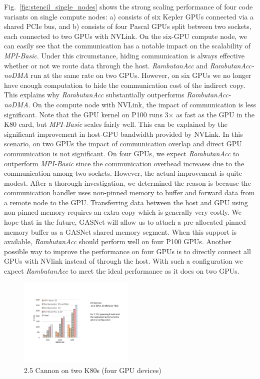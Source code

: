 Fig.~\ref{fig:stencil_single_nodes} shows the strong scaling performance of four code variants on single compute nodes: a) consists of six Kepler GPUs connected via a shared PCIe bus, and b) consists of four Pascal GPUs split between two sockets, each connected to two GPUs with NVLink.
On the six-GPU compute node, we can easily see that the communication has a notable impact on the scalability of {\em MPI-Basic}.
Under this circumstance, hiding communication is always effective whether or not we route data through the host.
{\em RambutanAcc} and {\em RambutanAcc-noDMA} run at the same rate on two GPUs.
However, on six GPUs we no longer have enough computation to hide the communication cost of the indirect copy.
This explains why {\em RambutanAcc} substantially outperforms {\em RambutanAcc-noDMA}.
On the compute node with NVLink, the impact of communication is less significant.
Note that the GPU kernel on P100 runs 3$\times$ as fast as the GPU in the K80 card, but {\em MPI-Basic} scales fairly well.
This can be explained by the significant improvement in host-GPU bandwidth provided by NVLink.
In this scenario, on two GPUs the impact of communication overlap and direct GPU communication is not significant.
On four GPUs, we expect {\em RambutanAcc} to outperform {\em MPI-Basic} since the communication overhead increases due to the communication among two sockets.
However, the actual improvement is quite modest.
After a thorough investigation, we determined the reason is because the communication handler uses non-pinned memory to buffer and forward data from a remote node to the GPU.
Transferring data between the host and GPU using non-pinned memory requires an extra copy which is generally very costly.
We hope that in the future, GASNet will allow us to attach a pre-allocated pinned memory buffer as a GASNet shared memory segment.
When this support is available, {\em RambutanAcc} should perform well on four P100 GPUs.
Another possible way to improve the performance on four GPUs is to directly connect all GPUs with NVlink instead of through the host.
With such a configuration we expect {\em RambutanAcc} to meet the ideal performance as it does on two GPUs.




\begin{figure}[htb]
\centering
\includegraphics[width=0.49\textwidth]{figures/cannon_tida.pdf}
\caption{2.5 Cannon on two K80s (four GPU devices)}
\label{cannon_onnode}
\end{figure}



